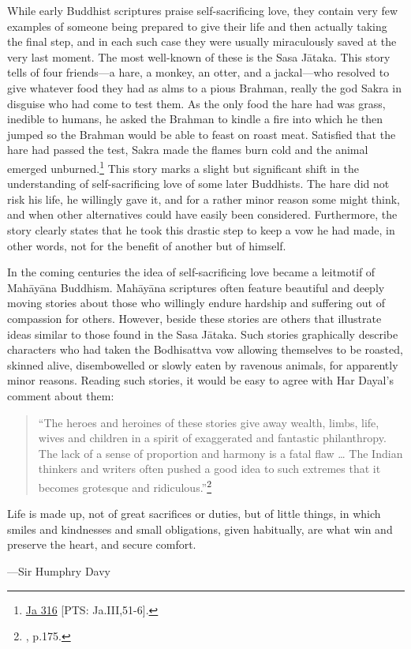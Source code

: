 \documentclass[10pt, openright]{book}
\newenvironment{epigram-2}%
{%
\setstretch{1.4}
\vspace{1em}
\noindent
\quoting[leftmargin=2cm,rightmargin=2cm]%
\begin{itshape}
\large
}%
{\end{itshape}\endquoting
}%
\newenvironment{epigram-2-cite}%
{%
\quoting[leftmargin=2cm,rightmargin=2cm]%
\noindent\normal\hspace*{\fill} 
}%
{\endquoting
}%
\begin{document}
While early Buddhist scriptures praise self-sacrificing love, they contain very few examples of someone being prepared to give their life and then actually taking the final step, and in each such case they were usually miraculously saved at the very last moment. The most well-known of these is the Sasa Jātaka. This story tells of four friends—a hare, a monkey, an otter, and a jackal—who resolved to give whatever food they had as alms to a pious Brahman, really the god Sakra in disguise who had come to test them. As the only food the hare had was grass, inedible to humans, he asked the Brahman to kindle a fire into which he then jumped so the Brahman would be able to feast on roast meat. Satisfied that the hare had passed the test, Sakra made the flames burn cold and the animal emerged unburned.\footnote {\href{https://suttacentral.net/ja316/en/francis-neil}{Ja 316} [PTS: Ja.III,51-6].} This story marks a slight but significant shift in the understanding of self-sacrificing love of some later Buddhists. The hare did not risk his life, he willingly gave it, and for a rather minor reason some might think, and when other alternatives could have easily been considered. Furthermore, the story clearly states that he took this drastic step to keep a vow he had made, in other words, not for the benefit of another but of himself.


In the coming centuries the idea of self-sacrificing love became a leitmotif of Mahāyāna Buddhism. Mahāyāna scriptures often feature beautiful and deeply moving stories about those who willingly endure hardship and suffering out of compassion for others. However, beside these stories are others that illustrate ideas similar to those found in the Sasa Jātaka. Such stories graphically describe characters who had taken the Bodhisattva vow allowing themselves to be roasted, skinned alive, disembowelled or slowly eaten by ravenous animals, for apparently minor reasons. Reading such stories, it would be easy to agree with Har Dayal’s comment about them:


\begin{quote}

\hspace{-0.4em}“The heroes and heroines of these stories give away wealth, limbs, life, wives and children in a spirit of exaggerated and fantastic philanthropy. The lack of a sense of proportion and harmony is a fatal flaw … The Indian thinkers and writers often pushed a good idea to such extremes that it becomes grotesque and ridiculous.”\footnote {\cite{Dayal 1970}, p.175.}


\end{quote}
\begin{epigram-2}
Life is made up, not of great sacrifices or duties, but of little things, in which smiles and kindnesses and small obligations, given habitually, are what win and preserve the heart, and secure comfort.
\end{epigram-2}
\begin{epigram-2-cite}
—Sir Humphry Davy
\end{epigram-2-cite}
\end{document}

